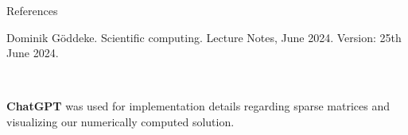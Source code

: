 \documentclass[11pt,aspectratio=1610]{beamer}
\begin{document}

\begin{frame}{References}

%
%

\begin{thebibliography}{1}

Dominik Göddeke.
\newblock Scientific computing.
\newblock Lecture Notes, June 2024.
\newblock Version: 25th June 2024.

\end{thebibliography}


\vspace{10mm} 

\textbf{ChatGPT} was used for implementation details regarding sparse matrices and visualizing our numerically computed solution. 


\end{frame}







%
%
\end{document}
